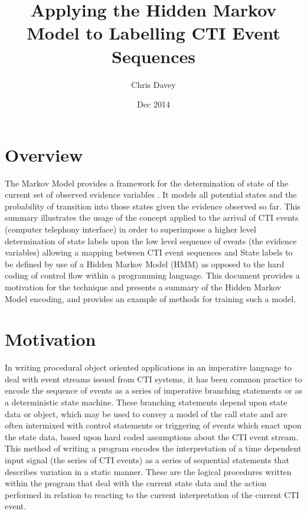 \documentclass[11pt]{article}
\begin{document}
\title{Applying the Hidden Markov Model to Labelling CTI Event Sequences }
\author{Chris Davey}
\date{Dec 2014}

\maketitle

\newpage

\tableofcontents

\newpage

\section{Overview}

The Markov Model provides a framework for the determination of state of the current set of observed evidence variables \cite{mai}. It models all potential states and the probability of transition into those states given the evidence observed so far. This summary illustrates the usage of the concept applied to the arrival of CTI events (computer telephony interface) in order to superimpose a higher level determination of state labels upon the low level sequence of events (the evidence variables) allowing a mapping between CTI event sequences and State labels to be defined by use of a Hidden Markov Model (HMM) as opposed to the hard coding of control flow within a programming language. This document provides a motivation for the technique and presents a summary of the Hidden Markov Model encoding, and provides an example of methods for training such a model.

\section{Motivation}


In writing procedural object oriented applications in an imperative language to deal with event streams issued from CTI systems, it has been common practice to encode the sequence of events as a series of imperative branching statements or as a deterministic state machine. These branching statements depend upon state data or object, which may be used to convey a model of the call state and are often intermixed with control statements or triggering of events which enact upon the state data, based upon hard coded assumptions about the CTI event stream. This method of writing a program encodes the interpretation of a time dependent input signal (the series of CTI events) as a series of sequential statements that describes variation in a static manner. These are the logical procedures written within the program that deal with the current state data and the action performed in relation to reacting to the current interpretation of the current CTI event.\\
 
\end{document}
